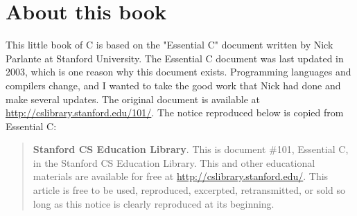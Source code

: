 \section*{About this book}

This little book of C is based on the "Essential C" document written by Nick Parlante at Stanford University.  The Essential C document was last updated in 2003, which is one reason why this document exists.  Programming languages and compilers change, and I wanted to take the good work that Nick had done and make several updates. The original document is available at \url{http://cslibrary.stanford.edu/101/}.  The notice reproduced below is copied from Essential C:

\begin{quote}
\textbf{Stanford CS Education Library}. This is document \#101, Essential C, in the Stanford CS Education Library. This and other educational materials are available for free at \url{http://cslibrary.stanford.edu/}. This article is free to be used, reproduced, excerpted, retransmitted, or sold so long as this notice is clearly reproduced at its beginning.
\end{quote}

